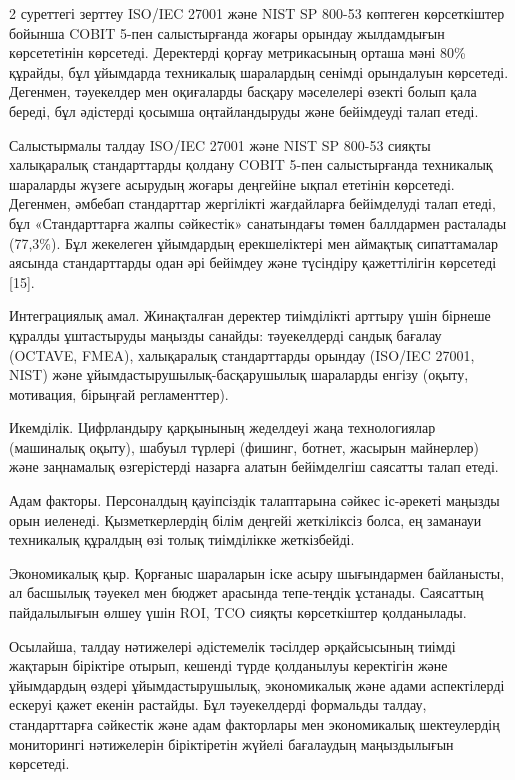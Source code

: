 \begin{multicols}{2}
2 суреттегі зерттеу ISO/IEC 27001 және NIST SP 800-53 көптеген
көрсеткіштер бойынша COBIT 5-пен салыстырғанда жоғары орындау
жылдамдығын көрсететінін көрсетеді. Деректерді қорғау метрикасының
орташа мәні 80\% құрайды, бұл ұйымдарда техникалық шаралардың сенімді
орындалуын көрсетеді. Дегенмен, тәуекелдер мен оқиғаларды басқару
мәселелері өзекті болып қала береді, бұл әдістерді қосымша
оңтайландыруды және бейімдеуді талап етеді.

Салыстырмалы талдау ISO/IEC 27001 және NIST SP 800-53 сияқты халықаралық
стандарттарды қолдану COBIT 5-пен салыстырғанда техникалық шараларды
жүзеге асырудың жоғары деңгейіне ықпал ететінін көрсетеді. Дегенмен,
әмбебап стандарттар жергілікті жағдайларға бейімделуді талап етеді, бұл
«Стандарттарға жалпы сәйкестік» санатындағы төмен баллдармен расталады
(77,3\%). Бұл жекелеген ұйымдардың ерекшеліктері мен аймақтық
сипаттамалар аясында стандарттарды одан әрі бейімдеу және түсіндіру
қажеттілігін көрсетеді {[}15{]}.

Интеграциялық амал. Жинақталған деректер тиімділікті арттыру үшін
бірнеше құралды ұштастыруды маңызды санайды: тәуекелдерді сандық бағалау
(OCTAVE, FMEA), халықаралық стандарттарды орындау (ISO/IEC 27001, NIST)
және ұйымдастырушылық-басқарушылық шараларды енгізу (оқыту, мотивация,
бірыңғай регламенттер).

Икемділік. Цифрландыру қарқынының жеделдеуі жаңа технологиялар
(машиналық оқыту), шабуыл түрлері (фишинг, ботнет, жасырын майнерлер)
және заңнамалық өзгерістерді назарға алатын бейімделгіш саясатты талап
етеді.

Адам факторы. Персоналдың қауіпсіздік талаптарына сәйкес іс-әрекеті
маңызды орын иеленеді. Қызметкерлердің білім деңгейі жеткіліксіз болса,
ең заманауи техникалық құралдың өзі толық тиімділікке жеткізбейді.

Экономикалық қыр. Қорғаныс шараларын іске асыру шығындармен байланысты,
ал басшылық тәуекел мен бюджет арасында тепе-теңдік ұстанады. Саясаттың
пайдалылығын өлшеу үшін ROI, TCO сияқты көрсеткіштер қолданылады.

Осылайша, талдау нәтижелері әдістемелік тәсілдер әрқайсысының тиімді
жақтарын біріктіре отырып, кешенді түрде қолданылуы керектігін және
ұйымдардың өздері ұйымдастырушылық, экономикалық және адами аспектілерді
ескеруі қажет екенін растайды. Бұл тәуекелдерді формальды талдау,
стандарттарға сәйкестік және адам факторлары мен экономикалық
шектеулердің мониторингі нәтижелерін біріктіретін жүйелі бағалаудың
маңыздылығын көрсетеді.


\end{multicols}
